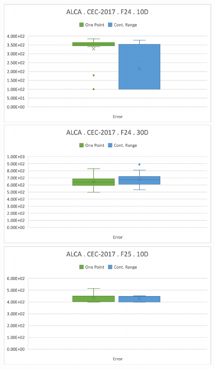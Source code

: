 \documentclass[graybox]{svmult}
\begin{document}
\begin{figure}[!ht]
\begin{minipage}[h]{0.49\linewidth}
        \end{minipage}
        \vfill
        \vspace{0.05 cm}
        \begin{minipage}[h]{0.49\linewidth}
            \includegraphics[width=1\linewidth]{img/fig_experiment_F24x10D.pdf} 
        \end{minipage}
        \hfill
        \begin{minipage}[h]{0.49\linewidth}
            \includegraphics[width=1\linewidth]{img/fig_experiment_F24x30D.pdf} 
        \end{minipage}
        \vfill
        \vspace{0.05 cm}        
        \begin{minipage}[h]{0.49\linewidth}
            \includegraphics[width=1\linewidth]{img/fig_experiment_F25x10D.pdf} 

\end{minipage}
\end{figure}
\end{document}
